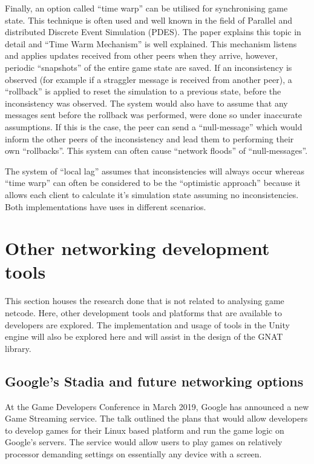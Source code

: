Finally, an option called ``time warp'' can be utilised for synchronising game state. This technique is often used and well known in the field of Parallel and distributed Discrete Event Simulation (PDES). The paper  explains this topic in detail and ``Time Warm Mechanism'' is well explained. This mechanism listens and applies updates received from other peers when they arrive, however, periodic ``snapshots'' of the entire game state are saved. If an inconsistency is observed (for example if a straggler message is received from another peer), a ``rollback'' is applied to reset the simulation to a previous state, before the inconsistency was observed. The system would also have to assume that any messages sent before the rollback was performed, were done so under inaccurate assumptions. If this is the case, the peer can send a ``null-message'' which would inform the other peers of the inconsistency and lead them to performing their own ``rollbacks''. This system can often cause ``network floods'' of ``null-messages''.

The system of ``local lag'' assumes that inconsistencies will always occur whereas ``time warp'' can often be considered to be the ``optimistic approach'' because it allows each client to calculate it's simulation state assuming no inconsistencies. Both implementations have uses in different scenarios.

\section{Other networking development tools}
This section houses the research done that is not related to analysing game netcode. Here, other development tools and platforms that are available to developers are explored. The implementation and usage of tools in the Unity engine will also be explored here and will assist in the design of the GNAT library.

\subsection{Google's Stadia and future networking options}
At the Game Developers Conference in March 2019, Google has announced a new Game Streaming service. The talk outlined the plans that would allow developers to develop games for their Linux based platform and run the game logic on Google's servers. The service would allow users to play games on relatively processor demanding settings on essentially any device with a screen.

